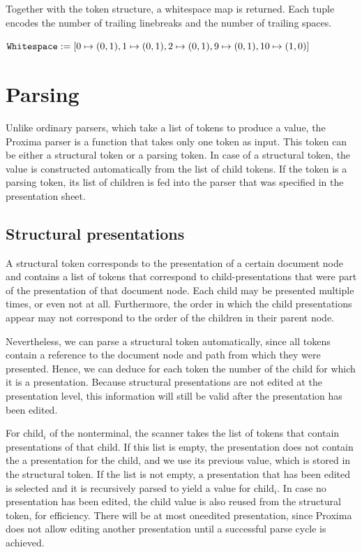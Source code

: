 \documentclass[12pt]{article}
\begin{document}
Together with the token structure, a whitespace map is returned. Each tuple encodes the number of trailing linebreaks and the number of trailing spaces. 

\noindent \begin{math}
\texttt{Whitespace}: =[ 0 \mapsto (0,1), 1 \mapsto (0,1), 2 \mapsto (0,1), 9 \mapsto (0,1), 10 \mapsto (1,0) ]
\end{math}






%
\section{Parsing}\label{sect:parser}
%

Unlike ordinary parsers, which take a list of tokens to produce a value, the Proxima parser is a function that takes only one token as input. This token can be either a structural token or a parsing token. In case of a structural token, the value is constructed automatically from the list of child tokens. If the token is a parsing token, its list of children is fed into the parser that was specified in the presentation sheet.

\subsection{Structural presentations}\label{subsect:parsingStructural}

A structural token corresponds to the presentation of a certain document node and contains a list of tokens that correspond to child-presentations that were part of the presentation of that document node. Each child may be presented multiple times, or even not at all. Furthermore, the order in which the child presentations appear may not correspond to the order of the children in their parent node.

Nevertheless, we can parse a structural token automatically, since all tokens contain a  reference to the document node and path from which they were presented. Hence, we can deduce for each token the number of the child for which it is a presentation. Because structural presentations are not edited at the presentation level, this information will still be valid after the presentation has been edited. 

For child$_i$ of the nonterminal, the scanner takes the list of tokens that contain presentations of that child. If this list is empty, the presentation does not contain the a presentation for the child, and we use its previous value, which is stored in the structural token. If the list is not empty, a presentation that has been edited is selected and it is recursively parsed to yield a value for child$_i$. In case no presentation has been edited, the child value is also reused from the structural token, for efficiency. There will be at most oneedited presentation, since Proxima does not allow editing another presentation until a successful parse cycle is achieved. 
\end{document}
